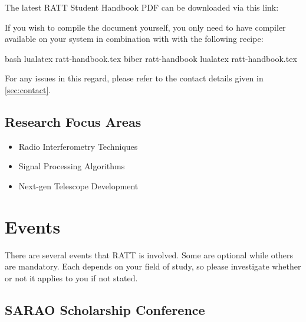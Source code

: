 \documentclass[12pt]{article}
\begin{document}
        The latest RATT Student Handbook PDF can be downloaded via this link:

        \begin{quotation}
        \end{quotation}

        If you wish to compile the document yourself, you only need to have  compiler available on your system in combination with  with the following recipe:

        \begin{rattcode}{bash}
            lualatex ratt-handbook.tex
            biber ratt-handbook
            lualatex ratt-handbook.tex
        \end{rattcode}

        For any issues in this regard, please refer to the contact details given in \cref{sec:contact}.

    \subsection{Research Focus Areas}
        \begin{itemize}
            \item Radio Interferometry Techniques
            \item Signal Processing Algorithms
            \item Next-gen Telescope Development
        \end{itemize}

\newpage

\section{Events}\label{sec:2:events}
    There are several events that RATT is involved. Some are optional while others are mandatory. Each depends on your field of study, so please investigate whether or not it applies to you if not stated.

    \subsection{SARAO Scholarship Conference}\label{subsec:sarao_scholarship_conference}
\end{document}
